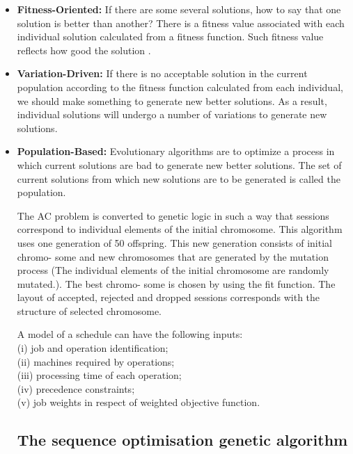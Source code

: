 \documentclass[a4paper,12pt]{report}
\begin{document}
{{{\begin{itemize}
				
				\item \textbf{Fitness-Oriented:} If there are some several solutions, how to say that one solution is better than another? There is a fitness value associated with each individual solution calculated from a fitness function. Such fitness value reflects how good the solution .
				\item \textbf{Variation-Driven: }If there is no acceptable solution in the current population according to the fitness function calculated from each individual, we should make something to generate new better solutions. As a result, individual solutions will undergo a number of variations to generate new solutions. 
				\item \textbf{Population-Based:} Evolutionary algorithms are to optimize a process in which current solutions are bad to generate new better solutions. The set of current solutions from which new solutions are to be generated is called the population.
				\par The AC
				problem is converted to genetic logic in such a way that
				sessions correspond to individual elements of the initial
				chromosome. This algorithm uses one generation of 50
				offspring. This new generation consists of initial chromo-
				some and new chromosomes that are generated by the
				mutation process (The individual elements of the initial
				chromosome are randomly mutated.). The best chromo-
				some is chosen by using the fit function. The layout of
				accepted, rejected and dropped sessions corresponds with
				the structure of selected chromosome.
				
			\vspace{40.0}
			
		\par	A model of a schedule can have the following inputs: \\(i) job and operation identification; \\(ii) machines required by operations;\\ (iii) processing time of each operation; \\(iv) precedence constraints; \\(v) job weights in respect of weighted objective function.
		
		\subsection{	The sequence optimisation genetic algorithm}
	

\end{itemize}}}}
\end{document}
